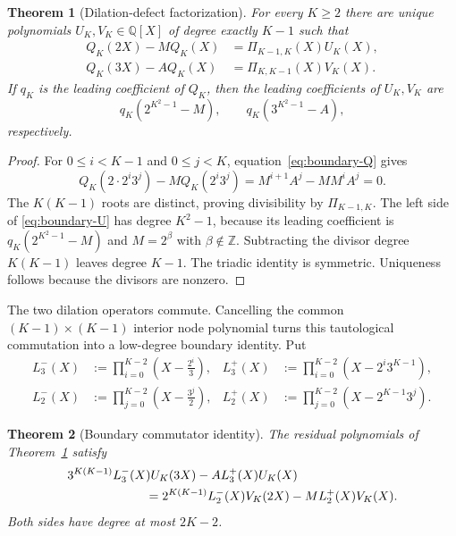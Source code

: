 \documentclass[11pt,oneside]{article}
\newtheorem{theorem}{Theorem}[section]
\theoremstyle{definition}
\theoremstyle{remark}
\newcommand{\Z}{\mathbb Z}
\newcommand{\Q}{\mathbb Q}
\begin{document}
\begin{theorem}[Dilation-defect factorization]
\label{thm:dilation-defect}
For every $K\ge2$ there are unique polynomials $U_K,V_K\in\Q[X]$ of degree exactly $K-1$
such that
\begin{align}
 Q_K(2X)-M Q_K(X)&=\Pi_{K-1,K}(X)U_K(X),
 \label{eq:boundary-U}\\
 Q_K(3X)-A Q_K(X)&=\Pi_{K,K-1}(X)V_K(X).
 \label{eq:boundary-V}
\end{align}
If $q_K$ is the leading coefficient of $Q_K$, then the leading coefficients of $U_K,V_K$ are
\begin{equation}
 q_K(2^{K^2-1}-M),
 \qquad
 q_K(3^{K^2-1}-A),
 \label{eq:boundary-leading}
\end{equation}
respectively.
\end{theorem}

\begin{proof}
For $0\le i<K-1$ and $0\le j<K$, equation~\eqref{eq:boundary-Q} gives
\[
 Q_K(2\cdot2^i3^j)-M Q_K(2^i3^j)
 =M^{i+1}A^j-MM^iA^j=0.
\]
The $K(K-1)$ roots are distinct, proving divisibility by $\Pi_{K-1,K}$.  The left side of
\eqref{eq:boundary-U} has degree $K^2-1$, because its leading coefficient is
$q_K(2^{K^2-1}-M)$ and $M=2^\beta$ with $\beta\notin\Z$.  Subtracting the divisor degree
$K(K-1)$ leaves degree $K-1$.  The triadic identity is symmetric.  Uniqueness follows because
the divisors are nonzero.
\end{proof}

The two dilation operators commute.  Cancelling the common $(K-1)\times(K-1)$ interior node
polynomial turns this tautological commutation into a low-degree boundary identity.  Put
\begin{align*}
 L_3^-(X)&:=\prod_{i=0}^{K-2}\left(X-\frac{2^i}{3}\right),
 &L_3^+(X)&:=\prod_{i=0}^{K-2}\left(X-2^i3^{K-1}\right),\\
 L_2^-(X)&:=\prod_{j=0}^{K-2}\left(X-\frac{3^j}{2}\right),
 &L_2^+(X)&:=\prod_{j=0}^{K-2}\left(X-2^{K-1}3^j\right).
\end{align*}

\begin{theorem}[Boundary commutator identity]
\label{thm:boundary-commutator}
The residual polynomials of Theorem~\ref{thm:dilation-defect} satisfy
\begin{align}
 &3^{K(K-1)}L_3^-(X)U_K(3X)-A L_3^+(X)U_K(X)
 \notag\\
 &\hspace{2.2cm}=
 2^{K(K-1)}L_2^-(X)V_K(2X)-M L_2^+(X)V_K(X).
 \label{eq:boundary-commutator}
\end{align}
Both sides have degree at most $2K-2$.
\end{theorem}
\end{document}
